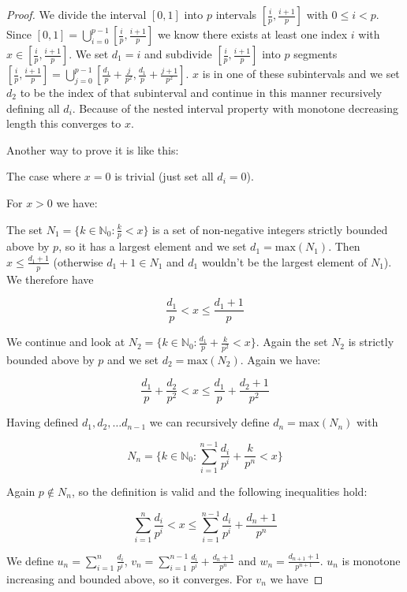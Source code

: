 \begin{proof}

We divide the interval $[0, 1]$ into $p$ intervals $[\frac{i}{p}, \frac{i+1}{p}]$ with $0 \leq i < p$. Since $[0, 1] = \bigcup_{i = 0}^{p-1} [\frac{i}{p}, \frac{i+1}{p}]$ we know there exists at least one index $i$ with $x \in [\frac{i}{p}, \frac{i+1}{p}]$. We set $d_1 = i$ and subdivide $[\frac{i}{p}, \frac{i+1}{p}]$ into $p$ segments $[\frac{i}{p}, \frac{i+1}{p}] = \bigcup_{j = 0}^{p-1} [\frac{d_1}{p} + \frac{j}{p^2},  \frac{d_1}{p} + \frac{j+1}{p^2}]$. $x$ is in one of these subintervals and we set $d_2$ to be the index of that subinterval and continue in this manner recursively defining all $d_i$. Because of the nested interval property with monotone decreasing length this converges to $x$.

Another way to prove it is like this:

The case where $x=0$ is trivial (just set all $d_i=0$). 

For $x > 0$ we have:

The set $N_1 = \{k \in \mathbb{N}_0: \frac{k}{p} < x\}$ is a set of non-negative integers strictly bounded above by $p$, so it has a largest element and we set $d_1 = \text{max}(N_1)$. Then $x \leq \frac{d_1 + 1}{p}$ (otherwise $d_1 + 1 \in N_1$ and $d_1$ wouldn't be the largest element of $N_1$). We therefore have

$$
\frac{d_1}{p} < x \leq \frac{d_1 + 1}{p}
$$

We continue and look at $N_2 = \{k \in \mathbb{N}_0: \frac{d_1}{p} + \frac{k}{p^2} < x\}$. Again the set $N_2$ is strictly bounded above by $p$ and we set $d_2 = \text{max}(N_2)$. Again we have:

$$
\frac{d_1}{p} + \frac{d_2}{p^2} < x \leq \frac{d_1}{p} + \frac{d_2 + 1}{p^2}
$$

Having defined $d_1, d_2, \ldots d_{n-1}$ we can recursively define $d_n=\text{max}(N_n)$ with 

$$
N_n = \{k \in \mathbb{N}_0: \sum_{i = 1}^{n-1} \frac{d_i}{p^i} + \frac{k}{p^n} < x\}
$$

Again $p \notin N_n$, so the definition is valid and the following inequalities hold:

$$
\sum_{i = 1}^n \frac{d_i}{p^i} < x \leq \sum_{i = 1}^{n-1} \frac{d_i}{p^i} + \frac{d_n + 1}{p^n}
$$

We define $u_n = \sum_{i = 1}^n \frac{d_i}{p^i}$, $v_n = \sum_{i = 1}^{n-1} \frac{d_i}{p^i} + \frac{d_n + 1}{p^n}$ and $w_n = \frac{d_{n+1} + 1}{p^{n+1}}$. $u_n$ is monotone increasing and bounded above, so it converges. For $v_n$ we have


\end{proof}
